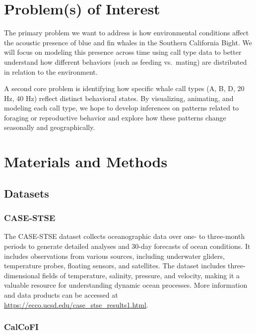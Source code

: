 \documentclass[
]{article}
\begin{document}
\section{Problem(s) of Interest}\label{problems-of-interest}

The primary problem we want to address is how environmental conditions
affect the acoustic presence of blue and fin whales in the Southern
California Bight. We will focus on modeling this presence across time
using call type data to better understand how different behaviors (such
as feeding vs.~mating) are distributed in relation to the environment.

A second core problem is identifying how specific whale call types (A,
B, D, 20 Hz, 40 Hz) reflect distinct behavioral states. By visualizing,
animating, and modeling each call type, we hope to develop inferences on
patterns related to foraging or reproductive behavior and explore how
these patterns change seasonally and geographically.

\section{Materials and Methods}\label{materials-and-methods}

\subsection{Datasets}\label{datasets}

\subsubsection{CASE-STSE}\label{case-stse}

The CASE-STSE dataset collects oceanographic data over one- to
three-month periods to generate detailed analyses and 30-day forecasts
of ocean conditions. It includes observations from various sources,
including underwater gliders, temperature probes, floating sensors, and
satellites. The dataset includes three-dimensional fields of
temperature, salinity, pressure, and velocity, making it a valuable
resource for understanding dynamic ocean processes. More information and
data products can be accessed at
\url{https://ecco.ucsd.edu/case_stse_results1.html}.

\subsubsection{CalCoFI}\label{calcofi}
\end{document}
